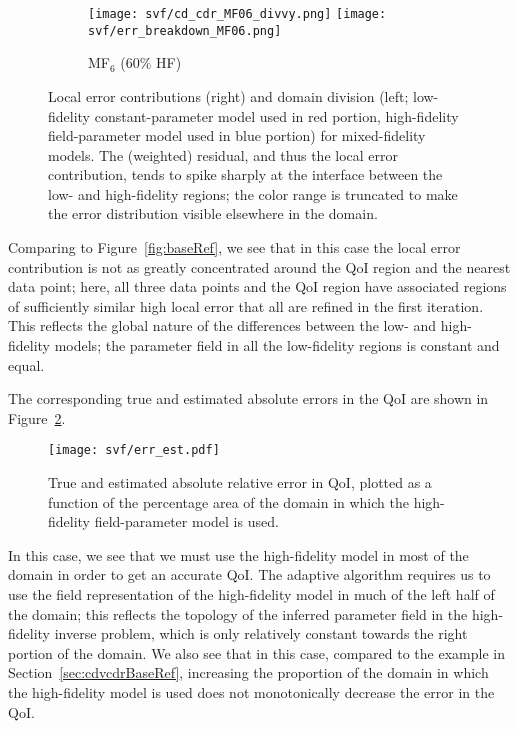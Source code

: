 \begin{figure}[h!]
\begin{subfigure}[b]{\textwidth}
	\centering
	\texttt{[image: svf/cd\_cdr\_MF06\_divvy.png]}
  \texttt{[image: svf/err\_breakdown\_MF06.png]}
  \vspace{-0.7\baselineskip}
  \caption{MF$_6$ ($60\%$ HF)}
\end{subfigure}
\caption{Local error contributions (right) and domain division (left; low-fidelity constant-parameter model used in red portion, high-fidelity field-parameter model used in blue portion) for mixed-fidelity models. The (weighted) residual, and thus the local error contribution, tends to spike sharply at the interface between the low- and high-fidelity regions; the color range is truncated to make the error distribution visible elsewhere in the domain.}
\label{fig:svfRef}
\end{figure}
%
Comparing to Figure~\ref{fig:baseRef}, we see that in this case the local error contribution is not as greatly concentrated around the QoI region and the nearest data point; here, all three data points and the QoI region have associated regions of sufficiently similar high local error that all are refined in the first iteration. This reflects the global nature of the differences between the low- and high-fidelity models; the parameter field in all the low-fidelity regions is constant and equal. 

The corresponding true and estimated absolute errors in the QoI are shown in Figure~\ref{fig:svfErr}.
%
\begin{figure}[h]
\centering
\texttt{[image: svf/err\_est.pdf]}
\caption{True and estimated absolute relative error in QoI, plotted as a function of the percentage area of the domain in which the high-fidelity field-parameter model is used.}
\label{fig:svfErr}
\end{figure}
%
In this case, we see that we must use the high-fidelity model in most of the domain in order to get an accurate QoI. The adaptive algorithm requires us to use the field representation of the high-fidelity model in much of the left half of the domain; this reflects the topology of the inferred parameter field in the high-fidelity inverse problem, which is only relatively constant towards the right portion of the domain. We also see that in this case, compared to the example in Section~\ref{sec:cdvcdrBaseRef}, increasing the proportion of the domain in which the high-fidelity model is used does not monotonically decrease the error in the QoI. 
